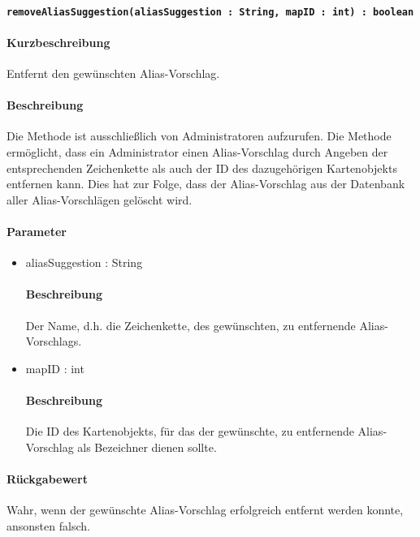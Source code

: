 \paragraph{\texttt{removeAliasSuggestion(aliasSuggestion : String, mapID : int) : boolean}}%
\paragraph*{Kurzbeschreibung}
Entfernt den gewünschten Alias-Vorschlag.
\paragraph*{Beschreibung}
Die Methode ist ausschließlich von Administratoren aufzurufen.
Die Methode ermöglicht, dass ein Administrator einen Alias-Vorschlag durch Angeben der entsprechenden Zeichenkette als auch der ID des dazugehörigen Kartenobjekts entfernen kann.
Dies hat zur Folge, dass der Alias-Vorschlag aus der Datenbank aller Alias-Vorschlägen gelöscht wird.
\paragraph*{Parameter}
\begin{itemize}
	\item aliasSuggestion : String
		\paragraph*{Beschreibung}
		Der Name, d.h. die Zeichenkette, des gewünschten, zu entfernende Alias-Vorschlags.
	\item mapID : int
		\paragraph*{Beschreibung}
		Die ID des Kartenobjekts, für das der gewünschte, zu entfernende Alias-Vorschlag als Bezeichner dienen sollte.
\end{itemize}
\paragraph*{Rückgabewert}
Wahr, wenn der gewünschte Alias-Vorschlag erfolgreich entfernt werden konnte, ansonsten falsch.
